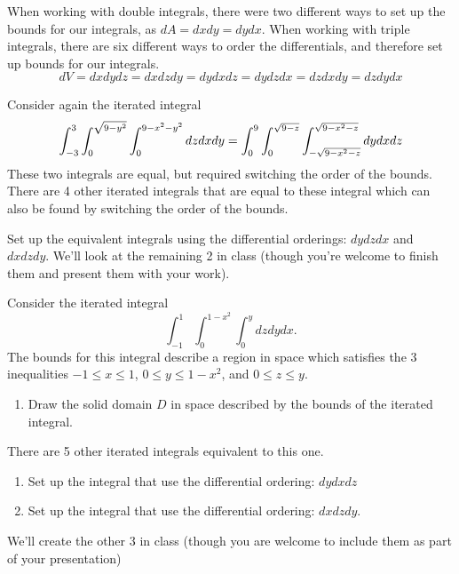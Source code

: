 When working with double integrals, there were two different ways to set up the bounds for our integrals, as $dA=dxdy=dydx$.  When working with triple integrals, there are six different ways to order the differentials, and therefore set up bounds for our integrals. $$dV=dxdydz = dxdzdy = dydxdz=dydzdx=dzdxdy=dzdydx$$ 


Consider again the iterated integral $$\displaystyle \int_{-3}^3 \int_0^{\sqrt{9-y^2}}\int_0^{9-x^2-y^2} dzdxdy = \int_0^9\int_0^{\sqrt{9-z}}\int_{-\sqrt{9-x^2-z}}^{\sqrt{9-x^2-z}} dydxdz$$ These two integrals are equal, but required switching the order of the bounds. There are 4 other iterated integrals that are equal to these integral which can also be found by switching the order of the bounds. 

\begin{problem}
Set up the equivalent integrals using the differential orderings: $dydzdx$ and $dxdzdy$.  We'll look at the remaining 2 in class (though you're welcome to finish them and present them with your work). 
\end{problem}

\begin{problem}
Consider the iterated integral $$\int_{-1}^1\int_0^{1-x^2}\int_0^{y} dzdydx.$$
The bounds for this integral describe a region in space which satisfies the 3 inequalities $-1\leq x\leq 1$, $0\leq y\leq 1-x^2$, and $0\leq z\leq y$.
\begin{enumerate}
 \item Draw the solid domain $D$ in space described by the bounds of the iterated integral.
\end{enumerate} 
There are 5 other iterated integrals equivalent to this one. 
\begin{enumerate}[resume]
	\item Set up the integral that use the differential ordering: $dydxdz$ 
	\item Set up the integral that use the differential ordering: $dxdzdy$.  
\end{enumerate}
We'll create the other 3 in class (though you are welcome to include them as part of your presentation)
\end{problem}



